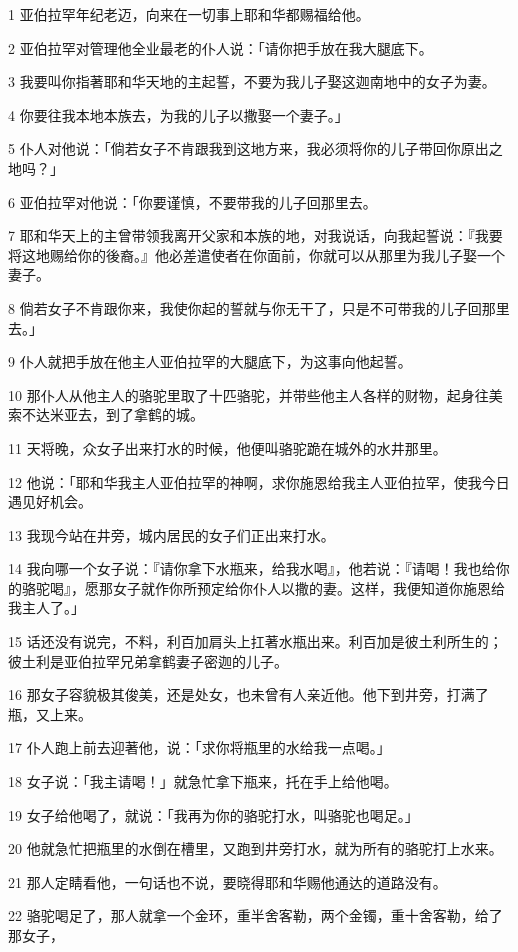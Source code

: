\par 1 亚伯拉罕年纪老迈，向来在一切事上耶和华都赐福给他。
\par 2 亚伯拉罕对管理他全业最老的仆人说：「请你把手放在我大腿底下。
\par 3 我要叫你指著耶和华天地的主起誓，不要为我儿子娶这迦南地中的女子为妻。
\par 4 你要往我本地本族去，为我的儿子以撒娶一个妻子。」
\par 5 仆人对他说：「倘若女子不肯跟我到这地方来，我必须将你的儿子带回你原出之地吗？」
\par 6 亚伯拉罕对他说：「你要谨慎，不要带我的儿子回那里去。
\par 7 耶和华天上的主曾带领我离开父家和本族的地，对我说话，向我起誓说：『我要将这地赐给你的後裔。』他必差遣使者在你面前，你就可以从那里为我儿子娶一个妻子。
\par 8 倘若女子不肯跟你来，我使你起的誓就与你无干了，只是不可带我的儿子回那里去。」
\par 9 仆人就把手放在他主人亚伯拉罕的大腿底下，为这事向他起誓。
\par 10 那仆人从他主人的骆驼里取了十匹骆驼，并带些他主人各样的财物，起身往美索不达米亚去，到了拿鹤的城。
\par 11 天将晚，众女子出来打水的时候，他便叫骆驼跪在城外的水井那里。
\par 12 他说：「耶和华我主人亚伯拉罕的神啊，求你施恩给我主人亚伯拉罕，使我今日遇见好机会。
\par 13 我现今站在井旁，城内居民的女子们正出来打水。
\par 14 我向哪一个女子说：『请你拿下水瓶来，给我水喝』，他若说：『请喝！我也给你的骆驼喝』，愿那女子就作你所预定给你仆人以撒的妻。这样，我便知道你施恩给我主人了。」
\par 15 话还没有说完，不料，利百加肩头上扛著水瓶出来。利百加是彼土利所生的；彼土利是亚伯拉罕兄弟拿鹤妻子密迦的儿子。
\par 16 那女子容貌极其俊美，还是处女，也未曾有人亲近他。他下到井旁，打满了瓶，又上来。
\par 17 仆人跑上前去迎著他，说：「求你将瓶里的水给我一点喝。」
\par 18 女子说：「我主请喝！」就急忙拿下瓶来，托在手上给他喝。
\par 19 女子给他喝了，就说：「我再为你的骆驼打水，叫骆驼也喝足。」
\par 20 他就急忙把瓶里的水倒在槽里，又跑到井旁打水，就为所有的骆驼打上水来。
\par 21 那人定睛看他，一句话也不说，要晓得耶和华赐他通达的道路没有。
\par 22 骆驼喝足了，那人就拿一个金环，重半舍客勒，两个金镯，重十舍客勒，给了那女子，
